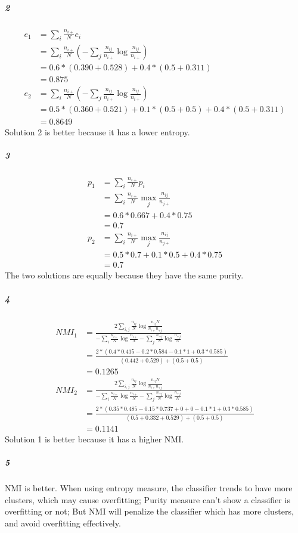 \documentclass[22pt]{article}
\begin{document}
		\subparagraph{2} 
		\begin{align}
			e_1 & = \sum_i \frac{n_{i+}}{N}e_i\\
			& = \sum_i \frac{n_{i+}}{N} (-\sum_j\frac{n_{ij}}{n_{i+}}\log\frac{n_{ij}}{n_{i+}})\\
			& = 0.6*(0.390+0.528)+0.4*(0.5+0.311)\\
			& = 0.875\\
			e_2 & =  \sum_i \frac{n_{i+}}{N} (-\sum_j\frac{n_{ij}}{n_{i+}}\log\frac{n_{ij}}{n_{i+}})\\
			& = 0.5*(0.360+0.521)+0.1*(0.5+0.5)+0.4*(0.5+0.311)\\
			& = 0.8649
		\end{align}
		Solution 2 is better because it has a lower entropy.

		\subparagraph{3}
		\begin{align}
			p_1 & = \sum_i \frac{n_{i+}}{N}p_i\\
			& = \sum_i \frac{n_{i+}}{N} \max_j\frac{n_{ij}}{n_{j+}}\\
			& = 0.6*0.667+0.4*0.75\\
			& = 0.7\\
			p_2 & = \sum_i \frac{n_{i+}}{N} \max_j\frac{n_{ij}}{n_{j+}}\\
			& = 0.5*0.7 + 0.1* 0.5+ 0.4*0.75\\
			& = 0.7
		\end{align}
		The two solutions are equally because they have the  same purity.

		\subparagraph{4}
		\begin{align}
			NMI_1 & = \frac{2\sum_{i,j}\frac{n_{ij}}{N}\log\frac{n_{ij}N}{n_{i+}n_{+j}}}{-\sum_i\frac{n_{i+}}{N}\log\frac{n_{i+}}{N}-\sum_j\frac{n_{+j}}{N}\log\frac{n_{+j}}{N}}\\
			& = \frac{2*(0.4*0.415-0.2*0.584-0.1*1+0.3*0.585)}{(0.442+0.529)+(0.5+0.5)}\\
			& = 0.1265\\
			NMI_2 & = \frac{2\sum_{i,j}\frac{n_{ij}}{N}\log\frac{n_{ij}N}{n_{i+}n_{+j}}}{-\sum_i\frac{n_{i+}}{N}\log\frac{n_{i+}}{N}-\sum_j\frac{n_{+j}}{N}\log\frac{n_{+j}}{N}}\\
			& = \frac{2*(0.35*0.485-0.15*0.737+0+0-0.1*1+0.3*0.585)}{(0.5+0.332+0.529)+(0.5+0.5)}\\
			& = 0.1141
		\end{align}
		Solution 1 is better because it has a higher NMI.

		\subparagraph{5}
		NMI is better. When using entropy measure, the classifier trends to have more clusters, which may cause overfitting; Purity measure can't show a classifier is overfitting or not; But NMI will penalize the classifier which has more clusters, and avoid overfitting effectively.
\end{document}

